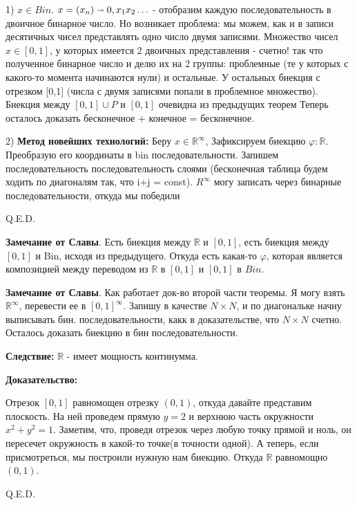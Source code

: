 \documentclass{article}
\begin{document}
    1) $x\in Bin$. $x=(x_n) \shortrightarrow 0,x_1x_2\ldots$ - отобразим каждую последовательность  в двоичное бинарное число. Но возникает проблема: мы можем, как и в записи десятичных чисел представлять одно число двумя записями. Множество чисел $x \in [0,1] $, у которых имеется 2 двоичных представления - счетно! так что полученное бинарное число и делю их на 2 группы: проблемные (те у которых с какого-то момента начинаются нули) и остальные. У остальных биекция с отрезком [0,1] (числа с двумя записями попали в проблемное множество). Биекция между $[0,1] \cup P$ и $[0,1]$ очевидна из предыдущих теорем Теперь осталось  доказать бесконечное + конечное = бесконечное.

    2) \textbf{Метод новейших технологий:} Беру $x \in \mathbb{R}^{\infty}$, Зафиксируем биекцию $\varphi: \mathbb{R}$. Преобразую его координаты в bin последовательности. Запишем последовательность последовательность слоями (бесконечная таблица будем ходить по диагоналям так, что i+j = const). $R^{\infty}$ могу записать через бинарные последовательности, откуда мы победили

\hfill Q.E.D.

\textbf{Замечание от Славы}. Есть биекция между $\mathbb{R}$ и $[0,1]$, есть биекция между $[0,1]$ и Bin, исходя из предыдущего. Откуда есть какая-то $\varphi$, которая является композицией между переводом из $\mathbb{R}$ в $[0,1]$ и $[0,1]$ в $Bin$.

\textbf{Замечание от Славы}. Как работает док-во второй части теоремы. Я могу взять $\mathbb{R}^{\infty}$, перевести ее в $[0,1]^{\infty}$. Запишу в качестве $N\times N$, и по диагональке начну выписывать бин. последовательности, какк в доказательстве, что $N\times N$ счетно. Осталось доказать биекцию в бин последовательности.

\textbf{Следствие:} $\mathbb{R}$ - имеет мощность континумма.

\textbf{Доказательство:}

    Отрезок $[0,1]$ равномощен отрезку $(0,1)$, откуда давайте представим плоскость. На ней проведем прямую $y=2$ и верхнюю часть окружности $x^2+y^2 =1$. Заметим, что, проведя отрезок через любую точку прямой и ноль,  он пересечет окружность в какой-то точке(в точности одной). А теперь, если присмотреться, мы построили нужную нам биекцию. Откуда $\mathbb{R}$ равномощно $(0,1)$.
    
\hfill Q.E.D.
\end{document}
